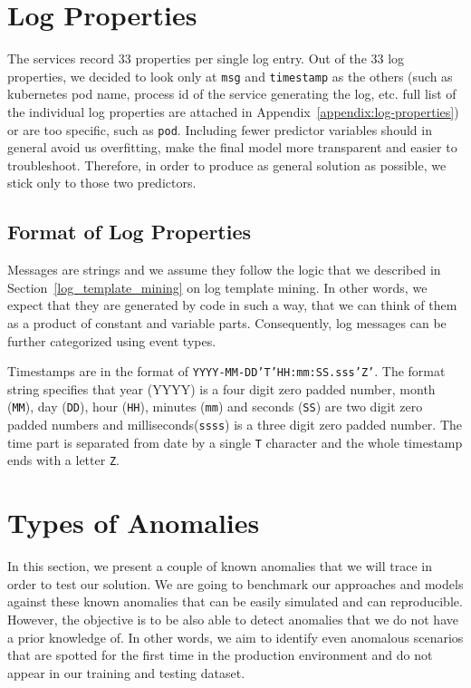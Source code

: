 \section{Log Properties}
The services record 33 properties per single log entry. Out of the 33 log properties, we decided to look only at \texttt{msg} and \texttt{timestamp} as the others (such as kubernetes pod name, process id of the service generating the log, etc. full list of the individual log properties are attached in Appendix~\ref{appendix:log-properties}) or are too specific, such as \texttt{pod}.
Including fewer predictor variables should in general avoid us overfitting, make the final model more transparent and easier to troubleshoot.
Therefore, in order to produce as general solution as possible, we stick only to those two predictors.

\subsection{Format of Log Properties}
Messages are strings and we assume they follow the logic that we described in Section~\ref{log_template_mining} on log template mining. In other words, we expect that they are generated by code in such a way, that we can think of them as a product of constant and variable parts. Consequently, log messages can be further categorized using event types.

Timestamps are in the format of \texttt{YYYY-MM-DD'T'HH:mm:SS.sss'Z'}. The format string specifies that year (YYYY) is a four digit zero padded number, month (\texttt{MM}), day (\texttt{DD}), hour (\texttt{HH}), minutes (\texttt{mm}) and seconds (\texttt{SS}) are two digit zero padded numbers and milliseconds(\texttt{ssss}) is a three digit zero padded number. The time part is separated from date by a single \texttt{T} character and the whole timestamp ends with a letter \texttt{Z}.

\section{Types of Anomalies}
\label{anomaly_types}
In this section, we present a couple of known anomalies that we will trace in order to test our solution.
We are going to benchmark our approaches and models against these known anomalies that can be easily simulated and can reproducible. 
However, the objective is to be also able to detect anomalies that we do not have a prior knowledge of.
In other words, we aim to identify even anomalous scenarios that are spotted for the first time in the production environment and do not appear in our training and testing dataset.

